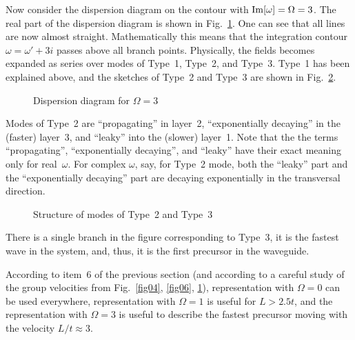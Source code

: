 \documentclass[12pt]{article}
\begin{document}
Now consider the dispersion diagram on the contour with ${\rm Im}[\omega] = \Omega = 3$. The real part of the 
dispersion diagram is shown in Fig.~\ref{fig08}. One can see that all lines are now almost straight. 
Mathematically this means that the integration contour 
$\omega = \omega' + 3i$
passes above all branch points. 
Physically, the fields becomes expanded as series over modes of Type~1, Type~2, and Type~3. 
Type~1 has been explained above, and the sketches of Type~2 and Type~3 are shown in Fig.~\ref{fig09}. 
  
\begin{figure}[ht]
\centerline{}
\caption{Dispersion diagram for $\Omega = 3$ } 
\label{fig08}
\end{figure}

Modes of Type~2 are ``propagating'' in layer~2, ``exponentially decaying'' in the (faster) layer~3,
and ``leaky'' into the (slower) layer~1. Note that the the terms 
``propagating'', 
``exponentially decaying'', and 
``leaky'' have their exact meaning only for real~$\omega$. For complex $\omega$, say, for Type~2 mode, both the ``leaky'' part and the ``exponentially decaying'' part are 
decaying exponentially in the transversal direction.

\begin{figure}[ht]
\centerline{}
\caption{Structure of modes of Type~2 and Type~3} 
\label{fig09}
\end{figure}

There is a single branch in the figure corresponding to Type~3, it is the fastest wave in the system, and, thus, it is the first precursor in the waveguide. 

According to item~6 of the previous section (and according to a careful study of the group velocities from Fig.~\ref{fig04}, \ref{fig06}, \ref{fig08}), representation with $\Omega = 0$
can be used everywhere, representation with $\Omega = 1$ is useful for 
$L > 2.5t$, and the representation with $\Omega = 3$ is useful to describe the fastest precursor moving with the velocity $L/t \approx 3$.
\end{document}
